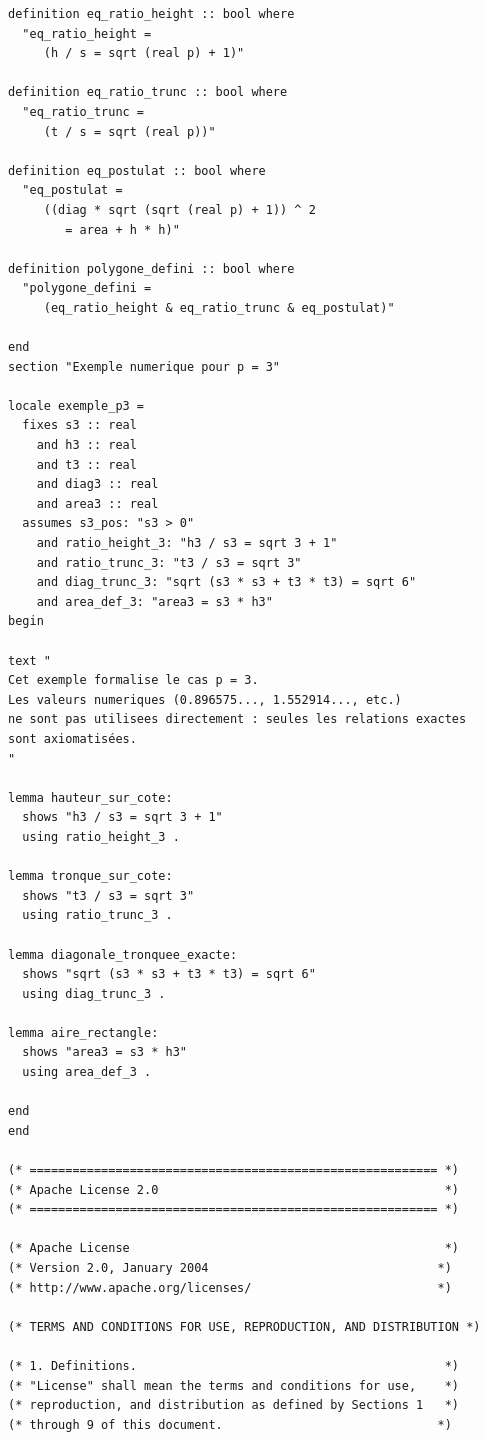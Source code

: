\documentclass[12pt,a4paper]{article}
\begin{document}
\begin{verbatim}
definition eq_ratio_height :: bool where
  "eq_ratio_height =
     (h / s = sqrt (real p) + 1)"

definition eq_ratio_trunc :: bool where
  "eq_ratio_trunc =
     (t / s = sqrt (real p))"

definition eq_postulat :: bool where
  "eq_postulat =
     ((diag * sqrt (sqrt (real p) + 1)) ^ 2
        = area + h * h)"

definition polygone_defini :: bool where
  "polygone_defini =
     (eq_ratio_height & eq_ratio_trunc & eq_postulat)"

end
section "Exemple numerique pour p = 3"

locale exemple_p3 =
  fixes s3 :: real
    and h3 :: real
    and t3 :: real
    and diag3 :: real
    and area3 :: real
  assumes s3_pos: "s3 > 0"
    and ratio_height_3: "h3 / s3 = sqrt 3 + 1"
    and ratio_trunc_3: "t3 / s3 = sqrt 3"
    and diag_trunc_3: "sqrt (s3 * s3 + t3 * t3) = sqrt 6"
    and area_def_3: "area3 = s3 * h3"
begin

text "
Cet exemple formalise le cas p = 3.
Les valeurs numeriques (0.896575..., 1.552914..., etc.)
ne sont pas utilisees directement : seules les relations exactes
sont axiomatisées.
"

lemma hauteur_sur_cote:
  shows "h3 / s3 = sqrt 3 + 1"
  using ratio_height_3 .

lemma tronque_sur_cote:
  shows "t3 / s3 = sqrt 3"
  using ratio_trunc_3 .

lemma diagonale_tronquee_exacte:
  shows "sqrt (s3 * s3 + t3 * t3) = sqrt 6"
  using diag_trunc_3 .

lemma aire_rectangle:
  shows "area3 = s3 * h3"
  using area_def_3 .

end
end

(* ========================================================= *)
(* Apache License 2.0                                        *)
(* ========================================================= *)

(* Apache License                                            *)
(* Version 2.0, January 2004                                *)
(* http://www.apache.org/licenses/                          *)

(* TERMS AND CONDITIONS FOR USE, REPRODUCTION, AND DISTRIBUTION *)

(* 1. Definitions.                                           *)
(* "License" shall mean the terms and conditions for use,    *)
(* reproduction, and distribution as defined by Sections 1   *)
(* through 9 of this document.                              *)


\end{verbatim}
\end{document}

